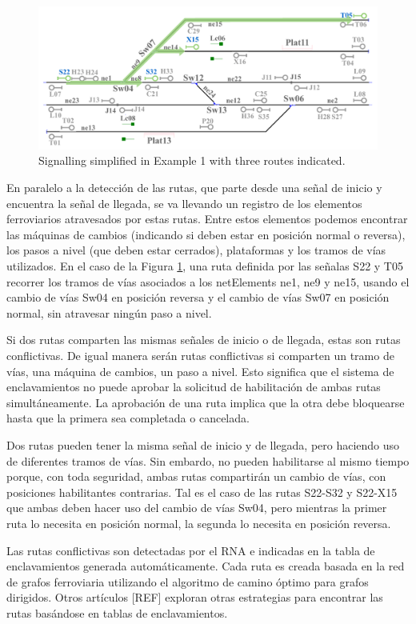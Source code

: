     \begin{figure}[h]
    	\centering
    	\includegraphics[width=1\textwidth]{Figuras/Figure11.pdf}
    	\centering\caption{Signalling simplified in Example 1 with three routes indicated.}
    	\label{fig:Routes}
    \end{figure}
        
    En paralelo a la detección de las rutas, que parte desde una señal de inicio y encuentra la señal de llegada, se va llevando un registro de los elementos ferroviarios atravesados por estas rutas. Entre estos elementos podemos encontrar las máquinas de cambios (indicando si deben estar en posición normal o reversa), los pasos a nivel (que deben estar cerrados), plataformas y los tramos de vías utilizados. En el caso de la Figura \ref{fig:Routes}, una ruta definida por las señalas S22 y T05 recorrer los tramos de vías asociados a los netElements ne1, ne9 y ne15, usando el cambio de vías Sw04 en posición reversa y el cambio de vías Sw07 en posición normal, sin atravesar ningún paso a nivel.
    
    Si dos rutas comparten las mismas señales de inicio o de llegada, estas son rutas conflictivas. De igual manera serán rutas conflictivas si comparten un tramo de vías, una máquina de cambios, un paso a nivel. Esto significa que el sistema de enclavamientos no puede aprobar la solicitud de habilitación de ambas rutas simultáneamente. La aprobación de una ruta implica que la otra debe bloquearse hasta que la primera sea completada o cancelada. 
    
    Dos rutas pueden tener la misma señal de inicio y de llegada, pero haciendo uso de diferentes tramos de vías. Sin embardo, no pueden habilitarse al mismo tiempo porque, con toda seguridad, ambas rutas compartirán un cambio de vías, con posiciones habilitantes contrarias. Tal es el caso de las rutas S22-S32 y S22-X15 que ambas deben hacer uso del cambio de vías Sw04, pero mientras la primer ruta lo necesita en posición normal, la segunda lo necesita en posición reversa.
    
    Las rutas conflictivas son detectadas por el RNA e indicadas en la tabla de enclavamientos generada automáticamente. Cada ruta es creada basada en la red de grafos ferroviaria utilizando el algoritmo de camino óptimo para grafos dirigidos. Otros artículos [REF] exploran otras estrategias para encontrar las rutas basándose en tablas de enclavamientos.   